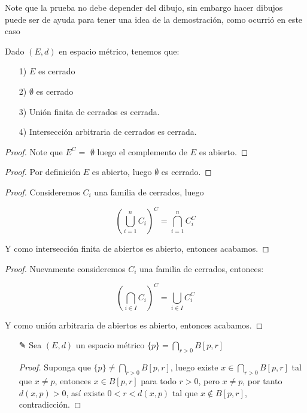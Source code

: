 \begin{itemize}
Note que la prueba no debe depender del dibujo, sin embargo hacer dibujos puede ser de ayuda para tener una idea de la demostración, como ocurrió en este caso

\begin{theorem}[Teorema 9]

Dado $(E,d)$ en espacio métrico, tenemos que:

\begin{itemize}
\item[1)]$E$ es cerrado

\item[2)] $\emptyset$ es cerrado

\item[3)] Unión finita de cerrados es cerrada.

\item[4)]Intersección arbitraria de cerrados es cerrada.

\end{itemize}
\end{theorem}

\begin{proof}
Note que $E^C=$ $\emptyset$ luego el complemento de $E$ es abierto. 
\end{proof}

\begin{proof}
Por definición $E$ es abierto, luego $\emptyset$ es cerrado.
\end{proof}

\begin{proof}
Consideremos $C_i$ una familia de cerrados, luego

$$\left(\bigcup_{i=1}^n C_i\right)^C=\bigcap_{i=1}^n C_i^C$$

Y como intersección finita de abiertos es abierto, entonces acabamos.
\end{proof}

\begin{proof}
Nuevamente consideremos $C_i$ una familia de cerrados, entonces:

$$\left(\bigcap_{i \in I}C_i\right)^C=\bigcup_{i\in I}C_i^C$$

Y como unión arbitraria de abiertos es abierto, entonces acabamos.

\end{proof}

\end{itemize}

\begin{itemize}
\item[✎]Sea $(E,d)$ un espacio métrico $\{p\}=\bigcap_{r>0} B[p, r]$\\

\begin{proof}
Suponga que $\{p\}\neq \bigcap_{r>0} B[p, r]$, luego existe $x\in \bigcap_{r>0} B[p, r]$ tal que $x\neq p$, entonces $x \in B[p,r]$ para todo $r>0$, pero $x\neq p$, por tanto $d(x,p)>0$, así existe $0<r<d(x,p)$ tal que $x\not \in B[p,r]$, contradicción.
 \end{proof}
\end{itemize}



